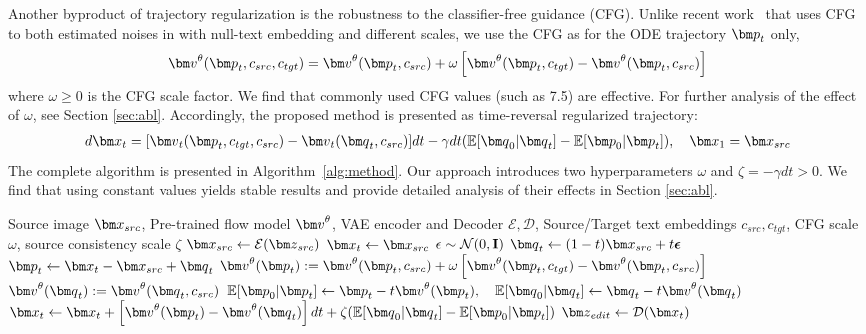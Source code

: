 Another byproduct of trajectory regularization is the robustness to the classifier-free guidance (CFG).
Unlike recent work~\cite{kulikov2024flowedit} that uses CFG to both estimated noises in with null-text embedding and different scales, 
we use the CFG as for the ODE trajectory $\vp_t$ only, 
\begin{align}
\vv^\theta(\vp_t,c_{src},c_{tgt}) = \vv^\theta(\vp_t, c_{src}) + \omega\left[\vv^\theta(\vp_t, c_{tgt}) - \vv^\theta(\vp_t, c_{src})\right]
\label{eqn:our_cfg}
\end{align}
where $\omega \geq 0$ is the CFG scale factor.
We find that commonly used CFG values (such as 7.5) are effective. For further analysis of the effect of $\omega$, see Section \ref{sec:abl}.
Accordingly, the proposed method is presented as time-reversal regularized trajectory:
\begin{align}
    d\vx_t = [\vv_t(\vp_t, c_{tgt}, c_{src}) - \vv_t(\vq_t, c_{src})]dt - \gamma dt (\mathbb{E}[\vq_0|\vq_t]-\mathbb{E}[\vp_0|\vp_t]),\quad \vx_1=\vx_{src}
    \label{eqn:final}
\end{align}
The complete algorithm is presented in Algorithm~\ref{alg:method}. Our approach introduces two hyperparameters $\omega$ and $\zeta=-\gamma dt >0$. We find that using constant values yields stable results and provide detailed analysis of their effects in Section \ref{sec:abl}.

\begin{algorithm}[!t]
\caption{Algorithm of FlowAlign on Latent Space}\label{alg:method}
\begin{algorithmic}[1]
\Require Source image $\vx_{src}$, Pre-trained flow model $\vv^\theta$, VAE encoder and Decoder $\mathcal{E}, \mathcal{D}$, 
Source/Target text embeddings $c_{src}, c_{tgt}$, CFG scale $\omega$, source consistency scale $\zeta$
\State $\vx_{src} \gets \mathcal{E}(\vz_{src})$
\State $\vx_t \gets \vx_{src}$
    \State $\epsilon \sim \mathcal{N}(0, {\mathbf{I}})$
    \State $\vq_t \gets (1-t) \vx_{src} + t \epsilonb$
    \State $\vp_t \gets \vx_t - \vx_{src} + \vq_t$
    \State $\vv^\theta(\vp_t) := \vv^\theta(\vp_t, c_{src}) + \omega\left[\vv^\theta(\vp_t, c_{tgt}) - \vv^\theta(\vp_t, c_{src})\right]$
    \State $\vv^\theta(\vq_t) := \vv^\theta(\vq_t, c_{src})$
    \State $\mathbb{E}[\vp_0|\vp_t] \gets \vp_t - t \vv^\theta(\vp_t), \quad \mathbb{E}[\vq_0|\vq_t] \gets \vq_t - t \vv^\theta(\vq_t)$
    \State $\vx_t \gets \vx_t + \left[\vv^\theta(\vp_t) - \vv^\theta(\vq_t)\right] dt + \zeta (\mathbb{E}[\vq_0|\vq_t]-\mathbb{E}[\vp_0|\vp_t])$
\EndFor
\State $\vz_{edit} \gets \mathcal{D}(\vx_t)$
\end{algorithmic}
\end{algorithm}

